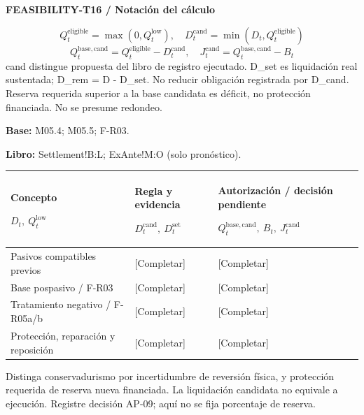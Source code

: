 \par\begingroup\sffamily\fontsize{8}{10}\selectfont\color{NEBGreen}\setlength{\parskip}{2pt}\setlength{\abovedisplayskip}{4pt}\setlength{\belowdisplayskip}{4pt}\setlength{\abovedisplayshortskip}{2pt}\setlength{\belowdisplayshortskip}{3pt}
\textbf{FEASIBILITY-T16 / Notación del cálculo}\par
{\fontsize{9}{11}\selectfont\[ Q_t^{\mathrm{eligible}}=\max(0,Q_t^{\mathrm{low}}),\quad D_t^{\mathrm{cand}}=\min(D_t,Q_t^{\mathrm{eligible}}) \]}
{\fontsize{9}{11}\selectfont\[ Q_t^{\mathrm{base,cand}}=Q_t^{\mathrm{eligible}}-D_t^{\mathrm{cand}},\quad J_t^{\mathrm{cand}}=Q_t^{\mathrm{base,cand}}-B_t \]}
cand distingue propuesta del libro de registro ejecutado. D\_set es liquidación real sustentada; D\_rem = D - D\_set. No reducir obligación registrada por D\_cand. Reserva requerida superior a la base candidata es déficit, no protección financiada. No se presume redondeo.\par
\textbf{Base:} M05.4; M05.5; F-R03.\par
\textbf{Libro:} Settlement!B:L; ExAnte!M:O (solo pronóstico).\par\endgroup
{\sffamily\fontsize{8.3}{10.3}\selectfont\begin{longtable}{@{}P{57.74mm} P{54.44mm} P{52.79mm}@{}}
\toprule
\textbf{Concepto}\par {\normalfont\fontsize{8.2}{10}\selectfont $D_t,\ Q_t^{\mathrm{low}}$} & \textbf{Regla y evidencia}\par {\normalfont\fontsize{8.2}{10}\selectfont $D_t^{\mathrm{cand}},\ D_t^{\mathrm{set}}$} & \textbf{Autorización / decisión pendiente}\par {\normalfont\fontsize{8.2}{10}\selectfont $Q_t^{\mathrm{base,cand}},\ B_t,\ J_t^{\mathrm{cand}}$}\\\midrule\endhead
\rule{0pt}{7.7mm}Pasivos compatibles previos & [Completar] & [Completar]\\\hline
\rule{0pt}{7.7mm}Base pospasivo / F-R03 & [Completar] & [Completar]\\\hline
\rule{0pt}{7.7mm}Tratamiento negativo / F-R05a/b & [Completar] & [Completar]\\\hline
\rule{0pt}{7.7mm}Protección, reparación y reposición & [Completar] & [Completar]\\\hline
\end{longtable}}
\begin{Notice}Distinga conservadurismo por incertidumbre de reversión física, y protección requerida de reserva nueva financiada. La liquidación candidata no equivale a ejecución. Registre decisión AP-09; aquí no se fija porcentaje de reserva.\end{Notice}
